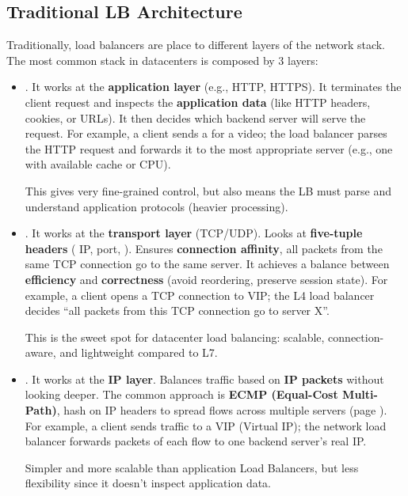 \subsection{Traditional LB Architecture}

Traditionally, load balancers are place to different layers of the network stack. The most common stack in datacenters is composed by 3 layers:
\begin{itemize}
    \item {}. It works at the \textbf{application layer} (e.g., HTTP, HTTPS). It terminates the client request and inspects the \textbf{application data} (like HTTP headers, cookies, or URLs). It then decides which backend server will serve the request. For example, a client sends a  for a  video; the load balancer parses the HTTP request and forwards it to the most appropriate server (e.g., one with available cache or CPU).

    This gives very fine-grained control, but also means the LB must parse and understand application protocols (heavier processing).

    
    \item {}. It works at the \textbf{transport layer} (TCP/UDP). Looks at \textbf{five-tuple headers} ( IP,  port, ). Ensures \textbf{connection affinity}, all packets from the same TCP connection go to the same server. It achieves a balance between \textbf{efficiency} and \textbf{correctness} (avoid reordering, preserve session state). For example, a client opens a TCP connection to VIP; the L4 load balancer decides ``all packets from this TCP connection go to server X''.
    
    This is the sweet spot for datacenter load balancing: scalable, connection-aware, and lightweight compared to L7.
    
    
    \item {}. It works at the \textbf{IP layer}. Balances traffic based on \textbf{IP packets} without looking deeper. The common approach is \textbf{ECMP (Equal-Cost Multi-Path)}, hash on IP headers to spread flows across multiple servers (page \pageref{subsection: Equal Cost Multi Path (ECMP)}). For example, a client sends traffic to a VIP (Virtual IP); the network load balancer forwards packets of each flow to one backend server's real IP.
    
    Simpler and more scalable than application Load Balancers, but less flexibility since it doesn't inspect application data.
\end{itemize}
